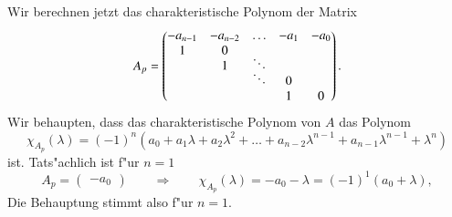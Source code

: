 Wir berechnen jetzt das charakteristische Polynom der Matrix
\begin{equation}
A_p=\begin{pmatrix}
-a_{n-1}&-a_{n-2}&\dots         &  -a_1&  -a_0\\
       1&       0&              &      &      \\
        &       1&\smash{\ddots}&      &      \\
        &        &\smash{\ddots}&     0&      \\
        &        &              &     1&     0
\end{pmatrix}.
\label{polynomnullstellen:A}
\end{equation}
Wir behaupten, dass das charakteristische Polynom von $A$ 
das Polynom
\[
\chi_{A_p}(\lambda)=
(-1)^n(
a_0+a_1\lambda+a_2\lambda^2+\dots+a_{n-2}\lambda^{n-1}+a_{n-1}\lambda^{n-1}+\lambda^n
)
\]
ist.
Tats"achlich ist f"ur $n=1$ 
\[
A_p=\begin{pmatrix}-a_0\end{pmatrix}
\qquad
\Rightarrow
\qquad
\chi_{A_p}(\lambda)=-a_0-\lambda=(-1)^1(a_0+\lambda),
\]
Die Behauptung stimmt also f"ur $n=1$.

